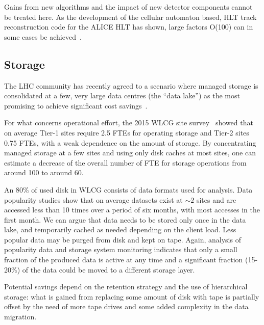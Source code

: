 Gains from new algorithms and the impact of new detector components
cannot be treated here. As the development of the cellular automaton
based, HLT track reconstruction code for the ALICE HLT has shown,
large factors O(100) can in some cases be achieved~\cite{rohr}.

\subsection{Storage}
The LHC community has recently agreed to a scenario where managed
storage is consolidated at a few, very large data centres (the ``data
lake'') as the most promising to achieve significant cost
savings~\cite{cwp}.

For what concerns operational effort, the 2015 WLCG site
survey~\cite{survey} showed that on average Tier-1 sites require 2.5
FTEs for operating storage and Tier-2 sites 0.75 FTEs, with a weak
dependence on the amount of storage. By concentrating managed storage
at a few sites and using only disk caches at
most sites, one can estimate a decrease of the overall number of FTE
for storage operations from around 100 to around 60.

An $80\%$ of used disk in WLCG consists of data formats used for
analysis. Data popularity studies show that on average datasets exist
at $\sim2$ sites and are accessed less than 10 times over a period of
six months, with most accesses in the first month.  We can argue that
data needs to be stored only once in the data lake, and temporarily
cached as needed depending on the client load. Less popular data may
be purged from disk and kept on tape.
Again, analysis of popularity data and storage system monitoring
indicates that only a small fraction of the produced data is active at
any time and a significant fraction (15-20\%) of the data could be
moved to a different storage layer.

Potential savings depend on the retention strategy and the use of
hierarchical storage: what is gained from replacing some amount of
disk with tape is partially offset by the need of more tape drives and
some added complexity in the data migration.

